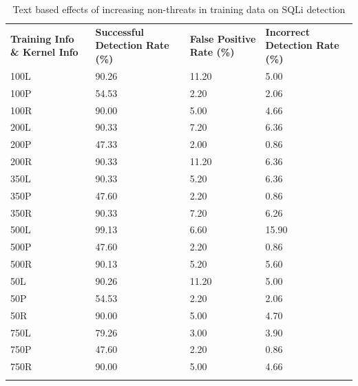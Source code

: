 \begin{appendices}
\begin{longtable}{|p{1.5in}|p{1in}|p{1in}|p{1in}|}
	\hline
	\textbf{Training Info \& Kernel Info} & \textbf{Successful Detection Rate (\%)} & \textbf{False Positive Rate (\%)} & \textbf{Incorrect Detection Rate (\%)}  \\
	\hhline{|=|=|=|=|}
 	100L & 90.26 & 11.20 &  5.00 \\ \hline
 	100P & 54.53 &  2.20 &  2.06 \\ \hline
 	100R & 90.00 &  5.00 &  4.66 \\ \hline
 	200L & 90.33 &  7.20 &  6.36 \\ \hline
 	200P & 47.33 &  2.00 &  0.86 \\ \hline
 	200R & 90.33 & 11.20 &  6.36 \\ \hline
 	350L & 90.33 &  5.20 &  6.36 \\ \hline
 	350P & 47.60 &  2.20 &  0.86 \\ \hline
 	350R & 90.33 &  7.20 &  6.26 \\ \hline
 	500L & 99.13 &  6.60 & 15.90 \\ \hline
 	500P & 47.60 &  2.20 &  0.86 \\ \hline
 	500R & 90.13 &  5.20 &  5.60 \\ \hline
  	50L & 90.26 & 11.20 &  5.00 \\ \hline
  	50P & 54.53 &  2.20 &  2.06 \\ \hline
  	50R & 90.00 &  5.00 &  4.70 \\ \hline
 	750L & 79.26 &  3.00 &  3.90 \\ \hline
 	750P & 47.60 &  2.20 &  0.86 \\ \hline
 	750R & 90.00 &  5.00 &  4.66 \\ \hline
 	\caption{Text based effects of increasing non-threats in training data on SQLi detection}
\end{longtable}


\end{appendices}
